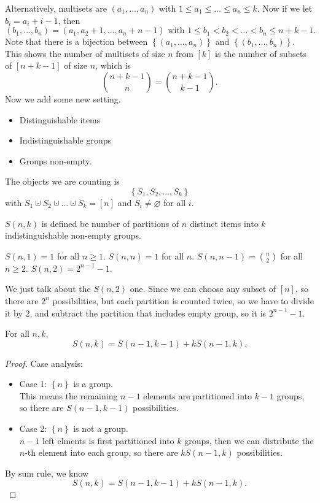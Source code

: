 Alternatively, multisets are \((a_1, \dots , a_n)\) with \(1 \le a_1 \le \dots \le a_n \le k\). Now if we let \(b_i = a_i + i - 1\), then 
\[
    (b_1, \dots , b_n) = (a_1, a_2 + 1, \dots , a_n + n - 1) \text{ with } 1 \le b_1 < b_2 < \dots < b_n \le n + k - 1.
\]   Note that there is a bijection between \(\left\{ (a_1, \dots , a_n) \right\} \) and \(\left\{ (b_1, \dots , b_n) \right\} \). This shows the number of multisets of size \(n\) from \([k]\) is the number of subsets of \([n + k - 1]\) of size \(n\), which is 
\[
    \binom{n + k - 1}{n} = \binom{n + k - 1}{k - 1}.
\]      
Now we add some new setting. 
\begin{itemize}
    \item Distinguishable items 
    \item Indistinguishable groups 
    \item Groups non-empty.
\end{itemize}
The objects we are counting is 
\[
    \left\{ S_1, S_2, \dots , S_k \right\} 
\] with \(S_1 \cupdot S_2 \cupdot \dots \cupdot S_k = [n]\) and \(S_i \neq \varnothing \) for all \(i\). 

\begin{definition} \label{def: stirling num second kind}
\(S(n,k)\) is defined be number of partitions of \(n\) distinct items into \(k\) indistinguishable non-empty groups.
\end{definition}

\begin{eg}
    \(S(n, 1) = 1\) for all \(n \ge 1\). \(S(n, n) = 1\) for all \(n\). \(S(n, n-1) = \binom{n}{2}\) for all \(n \ge 2\). \(S(n, 2) = 2^{n-1} - 1\).       
\end{eg}
\begin{explanation}
    We just talk about the \(S(n, 2)\) one. Since we can choose any subset of \([n]\), so there are \(2^n\) possibilities, but each partition is counted twice, so we have to divide it by \(2\), and subtract the partition that includes empty group, so it is \(2^{n-1} - 1\).    
\end{explanation}

\begin{proposition}
    For all \(n, k\), 
    \[
        S(n, k) = S(n-1, k-1) + k S(n-1,k).
    \]  
\end{proposition}
\begin{proof}
    Case analysis: 
    \begin{itemize}
        \item Case 1: \(\left\{ n \right\} \) is a group. \\
        This means the remaining \(n-1\) elements are partitioned into \(k-1\) groups, so there are \(S(n-1, k-1)\) possibilities. 
        \item Case 2: \(\left\{ n \right\} \) is not a group.  \\
        \(n - 1\) left elments is first partitioned into \(k\) groups, then we can distribute the \(n\)-th element into each group, so there are \(k S(n-1, k)\) possibilities.    
    \end{itemize}
    By sum rule, we know 
    \[
        S(n, k) = S(n - 1, k - 1) + k S(n - 1, k).
    \]
\end{proof}


